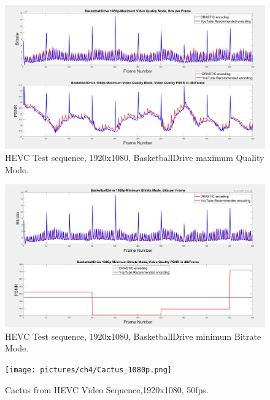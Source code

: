 \documentclass{book}
\begin{document}
\begin{figure}[hbt!]
	\centering
	\includegraphics[width=\linewidth]{pictures/ch4/BBDrive_MaxQ.png}
	\caption{HEVC Test sequence, 1920x1080, BasketballDrive maximum Quality Mode.}
	\label{fig:BBDrive_maxQ}
\end{figure}





\begin{figure}[hbt!]
	\centering
	\includegraphics[width=\linewidth]{pictures/ch4/BBDrive_MinBits1.png}
	\caption{HEVC Test sequence, 1920x1080, BasketballDrive minimum Bitrate Mode.}
	\label{fig:BBDrive_minB}
\end{figure}

\begin{figure}[hbt!]
	\centering
	{\texttt{[image: pictures/ch4/Cactus\_1080p.png]}
		\label{fig:x265_Cactus}}
	\caption{Cactus from HEVC \cite{HEVCTestvideo} Video Sequence,1920x1080, 50fps.}
\end{figure}
\end{document}
